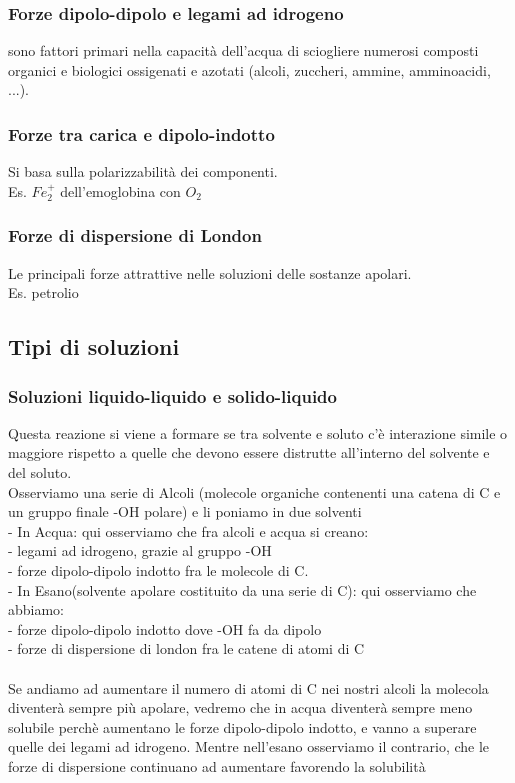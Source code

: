 \subsubsection{Forze dipolo-dipolo e legami ad idrogeno}
sono fattori primari nella capacità dell'acqua di sciogliere numerosi composti organici e biologici ossigenati e azotati (alcoli, zuccheri, ammine, amminoacidi, ...).
\subsubsection{Forze tra carica e dipolo-indotto}
Si basa sulla polarizzabilità dei componenti.\\
Es. $Fe_2^+$ dell'emoglobina con $O_2$
\subsubsection{Forze di dispersione di London}
Le principali forze attrattive nelle soluzioni delle sostanze apolari.\\
Es. petrolio
\subsection{Tipi di soluzioni}
\subsubsection{Soluzioni liquido-liquido e solido-liquido}
Questa reazione si viene a formare se tra solvente e soluto c’è interazione simile o maggiore rispetto a quelle che devono essere distrutte all’interno del solvente e del soluto.\\
Osserviamo una serie di Alcoli (molecole organiche contenenti una catena di C e un gruppo finale -OH polare) e li poniamo in due solventi\\
\tab- In Acqua: qui osserviamo che fra alcoli e acqua si creano:\\
\tab\tab- legami ad idrogeno, grazie al gruppo -OH\\
\tab\tab- forze dipolo-dipolo indotto fra le molecole di C. \\
\tab- In Esano(solvente apolare costituito da una serie di C): qui osserviamo che abbiamo:\\
\tab\tab- forze dipolo-dipolo indotto dove -OH fa da dipolo\\
\tab\tab- forze di dispersione di london fra le catene di atomi di C  \\\\
Se andiamo ad aumentare il numero di atomi di C nei nostri alcoli la molecola diventerà sempre più apolare, vedremo che in acqua diventerà sempre meno solubile perchè aumentano le forze dipolo-dipolo indotto, e vanno a superare quelle dei legami ad idrogeno. Mentre nell’esano osserviamo il contrario, che le forze di dispersione continuano ad aumentare favorendo la solubilità

